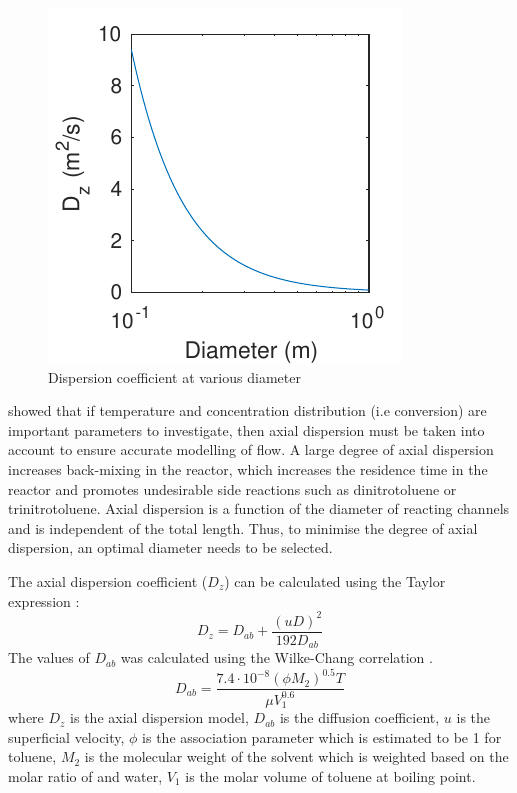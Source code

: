 \begin{figure}
    \includegraphics[scale=0.9]{figures/D_z}
    \caption{Dispersion coefficient at various diameter}
    \label{fig:dispersion}
\end{figure}
\textcite{young_axial_1973} showed that if temperature and concentration distribution (i.e conversion) are important parameters to investigate, then axial dispersion must be taken into account to ensure accurate modelling of flow. A large degree of axial dispersion increases back-mixing in the reactor, which increases the residence time in the reactor and promotes undesirable side reactions such as dinitrotoluene or trinitrotoluene. Axial dispersion is a function of the diameter of reacting channels and is independent of the total length. Thus, to minimise the degree of axial dispersion, an optimal diameter needs to be selected. 

The axial dispersion coefficient ($D_z$) can be calculated using the Taylor expression \cite{froment_chemical_2011}: 
\begin{equation}
    D_z=D_{ab}+\frac{(uD)^2}{192D_{ab}}
    \label{eq: axial dispersion coefficient}
\end{equation}
The values of $D_{ab}$ was calculated using the Wilke-Chang correlation \cite{wilke_correlation_1955}.
\begin{equation}
    D_{ab}=\frac{7.4\cdot 10^{-8}(\phi M_2)^{0.5}T}{\mu V_1^{0.6}}
    \label{wilkechang}
\end{equation}
where $D_z$ is the axial dispersion model, $D_{ab}$ is the diffusion coefficient, $u$ is the superficial velocity, $\phi$ is the association parameter which is estimated to be 1 for toluene, $M_2$ is the molecular weight of the solvent which is weighted based on the molar ratio of  and water, $V_1$ is the molar volume of toluene at boiling point.

